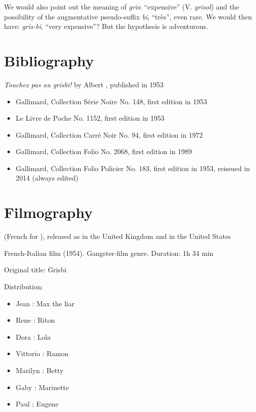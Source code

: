 
We would also point out the meaning of \emph{gris}: ``expensive'' (V. \emph{grisol}) and the possibility of the augmentative pseudo-suffix \emph{bi}, ``très'', even rare. We would then have: \emph{gris-bi}, ``very expensive''? But the hypothesis is adventurous.


\section{Bibliography\label{preamble-biblio}}

\emph{Touchez pas au grisbi!} by Albert , published in 1953

\begin{itemize}%
	\item Gallimard, Collection Série Noire No. 148, first edition in 1953
	\item Le Livre de Poche No. 1152, first edition in 1953
	\item Gallimard, Collection Carré Noir No. 94, first edition in 1972
	\item Gallimard, Collection Folio No. 2068, first edition in 1989
	\item Gallimard, Collection Folio Policier No. 183, first edition in 1953, reissued in 2014 (always edited)
\end{itemize}

\section{Filmography\label{preamble-filmography}}

 (French for ), released as  in the United Kingdom and  in the United States

French-Italian film (1954). Gangster-film genre. Duration: 1h 34 min

Original title: Grisbi
\newline

Distribution:

\begin{itemize}%
    \item Jean : Max the liar
    \item Rene : Riton
    \item Dora : Lola
    \item Vittorio : Ramon
    \item Marilyn : Betty
    \item Gaby : Marinette
    \item Paul : Eugene
\end{itemize}

